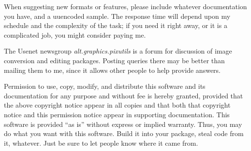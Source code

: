 When suggesting new formats or features, please include whatever
documentation you have, and a uuencoded sample.  The response time will
depend upon my schedule and the complexity of the task;  if you need it
right away, or it is a complicated job, you might consider paying me.

The Usenet newsgroup {\it alt.graphics.pixutils} is a forum for
discussion of image conversion and editing packages.  Posting queries
there may be better than mailing them to me, since it allows other people
to help provide answers.

Permission to use, copy, modify, and distribute this software and its
documentation for any purpose and without fee is hereby granted, provided
that the above copyright notice appear in all copies and that both that
copyright notice and this permission notice appear in supporting
documentation.  This software is provided ``as is'' without express or
implied warranty.  Thus, you may do what you want with this software.
Build it into your package, steal code from it, whatever.  Just be sure
to let people know where it came from.

%

\newpage
%


